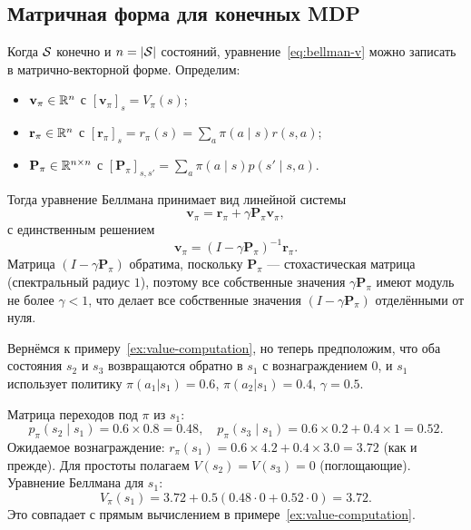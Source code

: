 \subsection*{Матричная форма для конечных MDP}

Когда $\mathcal{S}$ конечно и $n = |\mathcal{S}|$ состояний, уравнение~\eqref{eq:bellman-v} можно записать в матрично-векторной форме. Определим:
\begin{itemize}[leftmargin=*]
  \item $\mathbf{v}_\pi \in \mathbb{R}^n$ с $[\mathbf{v}_\pi]_s = V_\pi(s)$;
  \item $\mathbf{r}_\pi \in \mathbb{R}^n$ с $[\mathbf{r}_\pi]_s = r_\pi(s) = \sum_a \pi(a \mid s) r(s,a)$;
  \item $\mathbf{P}_\pi \in \mathbb{R}^{n \times n}$ с $[\mathbf{P}_\pi]_{s,s'} = \sum_a \pi(a \mid s) p(s' \mid s, a)$.
\end{itemize}

Тогда уравнение Беллмана принимает вид линейной системы
\begin{equation}
\label{eq:bellman-matrix}
\mathbf{v}_\pi = \mathbf{r}_\pi + \gamma \mathbf{P}_\pi \mathbf{v}_\pi,
\end{equation}
с единственным решением
\begin{equation}
\label{eq:bellman-matrix-solution}
\mathbf{v}_\pi = (I - \gamma \mathbf{P}_\pi)^{-1} \mathbf{r}_\pi.
\end{equation}
Матрица $(I - \gamma \mathbf{P}_\pi)$ обратима, поскольку $\mathbf{P}_\pi$ — стохастическая матрица (спектральный радиус $1$), поэтому все собственные значения $\gamma \mathbf{P}_\pi$ имеют модуль не более $\gamma < 1$, что делает все собственные значения $(I - \gamma \mathbf{P}_\pi)$ отделёнными от нуля.

\begin{example}
\label{ex:bellman-system}
Вернёмся к примеру~\ref{ex:value-computation}, но теперь предположим, что оба состояния $s_2$ и $s_3$ возвращаются обратно в $s_1$ с вознаграждением $0$, и $s_1$ использует политику $\pi(a_1|s_1)=0.6$, $\pi(a_2|s_1)=0.4$, $\gamma=0.5$.

Матрица переходов под $\pi$ из $s_1$:
\[
p_\pi(s_2 \mid s_1) = 0.6 \times 0.8 = 0.48,\quad
p_\pi(s_3 \mid s_1) = 0.6 \times 0.2 + 0.4 \times 1 = 0.52.
\]
Ожидаемое вознаграждение: $r_\pi(s_1) = 0.6 \times 4.2 + 0.4 \times 3.0 = 3.72$ (как и прежде). Для простоты полагаем $V(s_2) = V(s_3) = 0$ (поглощающие). Уравнение Беллмана для $s_1$:
\[
V_\pi(s_1) = 3.72 + 0.5 (0.48 \cdot 0 + 0.52 \cdot 0) = 3.72.
\]
Это совпадает с прямым вычислением в примере~\ref{ex:value-computation}.
\end{example}


